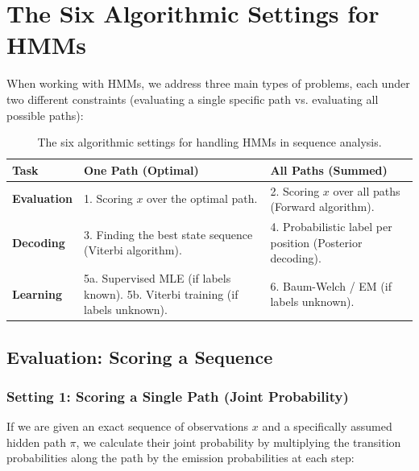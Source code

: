 
\section{The Six Algorithmic Settings for HMMs}

When working with HMMs, we address three main types of problems, each under two different constraints (evaluating a single specific path vs. evaluating all possible paths):

\begin{table}[ht]
\centering
\begin{tabularx}{\textwidth}{l X X}
\toprule
\textbf{Task} & \textbf{One Path (Optimal)} & \textbf{All Paths (Summed)} \\
\midrule
\textbf{Evaluation} & 1. Scoring $x$ over the optimal path. & 2. Scoring $x$ over all paths (Forward algorithm). \\
\textbf{Decoding} & 3. Finding the best state sequence (Viterbi algorithm). & 4. Probabilistic label per position (Posterior decoding). \\
\textbf{Learning} & 5a. Supervised MLE (if labels known). \newline 5b. Viterbi training (if labels unknown). & 6. Baum-Welch / EM (if labels unknown). \\
\bottomrule
\end{tabularx}
\caption{The six algorithmic settings for handling HMMs in sequence analysis.}
\end{table}

\subsection{Evaluation: Scoring a Sequence}

\subsubsection{Setting 1: Scoring a Single Path (Joint Probability)}

If we are given an exact sequence of observations \( x \) and a specifically assumed hidden path \( \pi \), we calculate their joint probability by multiplying the transition probabilities along the path by the emission probabilities at each step:

